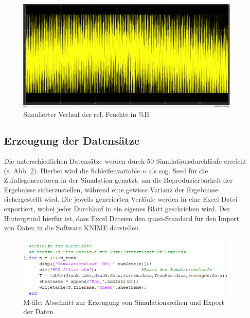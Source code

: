 \begin{figure}
    \includegraphics[height=0.9\textwidth,angle=90,origin=c]{images/sim_verlauf_feuchte.png}
    \caption[Simulierter Verlauf der rel. Feuchte]{Simulierter Verlauf der rel. Feuchte in \%H}
    \label{fi:sim_verlauf_feuchte}
    \end{figure}
    \subsection{Erzeugung der Datensätze}
    Die unterschiedlichen Datensätze werden durch 50 Simulationsdurchläufe erreicht (s. Abb. \ref{fi:sim_reihe}). Hierbei wird die Schleifenvariable $n$ als sog. Seed für die Zufallsgeneratoren in der Simulation genutzt, um die Reproduzierbarkeit der Ergebnisse sicherzustellen, während eine gewisse Varianz der Ergebnisse sichergestellt wird. Die jeweils generierten Verläufe werden in eine Excel Datei exportiert, wobei jeder Durchlauf in ein eigenes Blatt geschrieben wird. Der Hintergrund hierfür ist, dass Excel Dateien den quasi-Standard für den Import von Daten in die Software \ac{KNIME} darstellen.
    \begin{figure}[H]
        \begin{center}
            \includegraphics[width=\linewidth]{images/sim_reihe.png}
            \caption[M-file Simulationsreihen]{M-file: Abschnitt zur Erzeugung von Simulationsreihen und Export der Daten}
            \label{fi:sim_reihe}
        \end{center}
    \end{figure}
